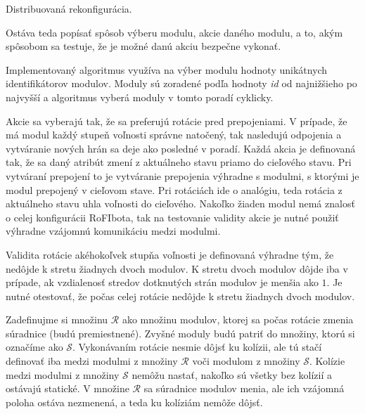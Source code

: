 \documentclass[
  digital, %
  oneside, %
  notable,   %
  lof,     %
  nolot,     %
]{fithesis3}
\begin{document}
\begin{algorithm}
    \caption{Distribuovaná rekonfigurácia. }
    \label{algorithm:algo2}
    
    \DontPrintSemicolon
    
\end{algorithm}

Ostáva teda popísať spôsob výberu modulu, akcie daného modulu, a to, akým spôsobom sa testuje, že je možné danú akciu bezpečne vykonať. 

Implementovaný algoritmus využíva na výber modulu hodnoty unikátnych identifikátorov modulov. Moduly sú zoradené podľa hodnoty \textit{id} od najnižšieho po najvyšší a algoritmus vyberá moduly v tomto poradí cyklicky. 

Akcie sa vyberajú tak, že sa preferujú rotácie pred prepojeniami. V prípade, že má modul každý stupeň voľnosti správne natočený, tak nasledujú odpojenia a vytváranie nových hrán sa deje ako posledné v poradí. Každá akcia je definovaná tak, že sa daný atribút zmení z aktuálneho stavu priamo do cieľového stavu. Pri vytváraní prepojení to je vytváranie prepojenia výhradne s modulmi, s ktorými je modul prepojený v cieľovom stave. Pri rotáciách ide o analógiu, teda rotácia z aktuálneho stavu uhla voľnosti do cieľového. Nakoľko žiaden modul nemá znalosť o celej konfigurácii RoFIbota, tak na testovanie validity akcie je nutné použiť výhradne vzájomnú komunikáciu medzi modulmi. 

Validita rotácie akéhokoľvek stupňa voľnosti je definovaná výhradne tým, že nedôjde k stretu žiadnych dvoch modulov. K stretu dvoch modulov dôjde iba v prípade, ak vzdialenosť stredov dotknutých strán modulov je menšia ako $1$. Je nutné otestovať, že počas celej rotácie nedôjde k stretu žiadnych dvoch modulov. 

Zadefinujme si množinu $\mathcal{R}$ ako množinu modulov, ktorej sa počas rotácie zmenia súradnice (budú premiestnené). Zvyšné moduly budú patriť do množiny, ktorú si označíme ako $\mathcal{S}$. Vykonávaním rotácie nesmie dôjsť ku kolízii, ale tú stačí definovať iba medzi modulmi z množiny $\mathcal{R}$ voči modulom z množiny $\mathcal{S}$. Kolízie medzi modulmi z množiny $\mathcal{S}$ nemôžu nastať, nakoľko sú všetky bez kolízií a ostávajú statické. V množine $\mathcal{R}$ sa súradnice modulov menia, ale ich vzájomná poloha ostáva nezmenená, a teda ku kolíziám nemôže dôjsť. 
\end{document}
